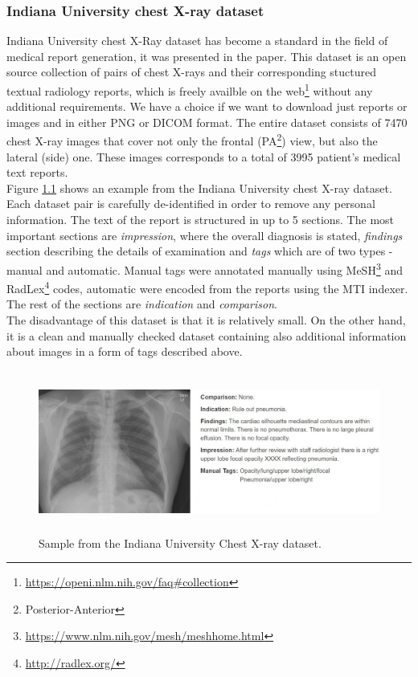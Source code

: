\subsubsection{Indiana University chest X-ray dataset}
Indiana University chest X-Ray dataset  has become a standard in the field of medical report generation, it was presented in the \citet{10.1093/jamia/ocv080} paper. This dataset is an open source collection of pairs of chest X-rays and their corresponding stuctured textual radiology reports, which is freely availble on the web\footnote[1]{\url{https://openi.nlm.nih.gov/faq\#collection}} without any additional requirements. We have a choice if we want to download just reports or images and in either PNG or DICOM format. The entire dataset consists of 7470 chest X-ray images that cover not only the frontal (PA\footnote[1]{Posterior-Anterior}) view, but also the lateral (side) one. These images corresponds to a total of 3995 patient's medical text reports.\\

Figure \hyperref[fig01:IUChestXRaySample]{1.1} shows an example from the Indiana University chest X-ray dataset. Each dataset pair is carefully de-identified in order to remove any personal information. The text of the report is structured in up to 5 sections. The most important sections are \textit{impression}, where the overall diagnosis is stated, \textit{findings} section describing the details of examination and \textit{tags} which are of two types - manual and automatic. Manual tags were annotated manually using MeSH\footnote[1]{\url{https://www.nlm.nih.gov/mesh/meshhome.html}} and RadLex\footnote[1]{\url{http://radlex.org/}} codes, automatic were encoded from the reports using the MTI indexer. The rest of the sections are \textit{indication} and \textit{comparison}.\\

The disadvantage of this dataset is that it is relatively small. On the other hand, it is a clean and manually checked dataset containing also additional information about images in a form of tags described above.

\begin{figure}[h]\centering
\includegraphics[width=145mm, height=53mm]{../img/IUChestXRaySample_CXR1728_IM-0479-1001}
\caption{Sample from the Indiana University Chest X-ray dataset.}
\label{fig01:IUChestXRaySample}
\end{figure}

